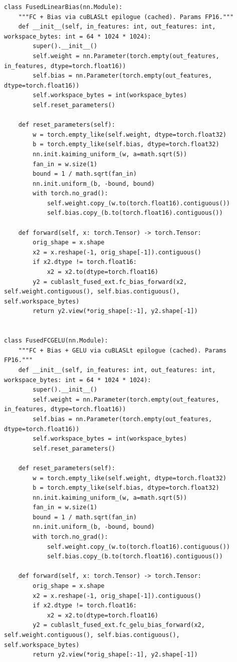 \begin{tcolorbox}[mybox, title={our model in Level 3 Task 44 — Reported 3.75 $\times$ Speedup}]
\begin{verbatim}
class FusedLinearBias(nn.Module):
    """FC + Bias via cuBLASLt epilogue (cached). Params FP16."""
    def __init__(self, in_features: int, out_features: int, workspace_bytes: int = 64 * 1024 * 1024):
        super().__init__()
        self.weight = nn.Parameter(torch.empty(out_features, in_features, dtype=torch.float16))
        self.bias = nn.Parameter(torch.empty(out_features, dtype=torch.float16))
        self.workspace_bytes = int(workspace_bytes)
        self.reset_parameters()

    def reset_parameters(self):
        w = torch.empty_like(self.weight, dtype=torch.float32)
        b = torch.empty_like(self.bias, dtype=torch.float32)
        nn.init.kaiming_uniform_(w, a=math.sqrt(5))
        fan_in = w.size(1)
        bound = 1 / math.sqrt(fan_in)
        nn.init.uniform_(b, -bound, bound)
        with torch.no_grad():
            self.weight.copy_(w.to(torch.float16).contiguous())
            self.bias.copy_(b.to(torch.float16).contiguous())

    def forward(self, x: torch.Tensor) -> torch.Tensor:
        orig_shape = x.shape
        x2 = x.reshape(-1, orig_shape[-1]).contiguous()
        if x2.dtype != torch.float16:
            x2 = x2.to(dtype=torch.float16)
        y2 = cublaslt_fused_ext.fc_bias_forward(x2, self.weight.contiguous(), self.bias.contiguous(), self.workspace_bytes)
        return y2.view(*orig_shape[:-1], y2.shape[-1])


class FusedFCGELU(nn.Module):
    """FC + Bias + GELU via cuBLASLt epilogue (cached). Params FP16."""
    def __init__(self, in_features: int, out_features: int, workspace_bytes: int = 64 * 1024 * 1024):
        super().__init__()
        self.weight = nn.Parameter(torch.empty(out_features, in_features, dtype=torch.float16))
        self.bias = nn.Parameter(torch.empty(out_features, dtype=torch.float16))
        self.workspace_bytes = int(workspace_bytes)
        self.reset_parameters()

    def reset_parameters(self):
        w = torch.empty_like(self.weight, dtype=torch.float32)
        b = torch.empty_like(self.bias, dtype=torch.float32)
        nn.init.kaiming_uniform_(w, a=math.sqrt(5))
        fan_in = w.size(1)
        bound = 1 / math.sqrt(fan_in)
        nn.init.uniform_(b, -bound, bound)
        with torch.no_grad():
            self.weight.copy_(w.to(torch.float16).contiguous())
            self.bias.copy_(b.to(torch.float16).contiguous())

    def forward(self, x: torch.Tensor) -> torch.Tensor:
        orig_shape = x.shape
        x2 = x.reshape(-1, orig_shape[-1]).contiguous()
        if x2.dtype != torch.float16:
            x2 = x2.to(dtype=torch.float16)
        y2 = cublaslt_fused_ext.fc_gelu_bias_forward(x2, self.weight.contiguous(), self.bias.contiguous(), self.workspace_bytes)
        return y2.view(*orig_shape[:-1], y2.shape[-1])



\end{verbatim}
\end{tcolorbox}
